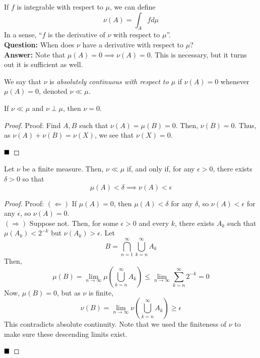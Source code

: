 
If $f$ is integrable with respect to $\mu$, we can define
\[ \nu(A) = \int_{A} f d\mu \]
In a sense, ``$f$ is the derivative of $\nu$ with respect to $\mu$''.\\

\textbf{Question:} When does $\nu$ have a derivative with respect to $\mu$?\\

\textbf{Answer:} Note that $\mu(A) = 0 \implies \nu(A) = 0$. This is necessary, but it turns out it is sufficient as well.

\begin{definition}
    We say that $\nu$ is \emph{absolutely continuous with respect to $\mu$} if $\nu(A) = 0$ whenever $\mu(A) = 0$, denoted $\nu \ll \mu$.
\end{definition}

\begin{lemma}
    If $\nu \ll \mu$ and $\nu \perp \mu$, then $\nu = 0$.
\end{lemma}
\begin{proof}{Proof:}
    Find $A, B$ such that $\nu(A) = \mu(B) = 0$. Then, $\nu(B) = 0$. Thus, as $\nu(A) + \nu(B) = \nu(X)$, we see that $\nu(X) = 0$.

    $\qed$
\end{proof}

\begin{lemma}
    Let $\nu$ be a finite measure. Then, $\nu \ll \mu$ if, and only if, for any $\epsilon > 0$, there exists $\delta > 0$ so that
    \[ \mu(A) < \delta \implies \nu(A) < \epsilon \]
\end{lemma}
\begin{proof}{Proof:}
    $(\Leftarrow)$ If $\mu(A) = 0$, then $\mu(A) < \delta$ for any $\delta$, so $\nu(A) < \epsilon$ for any $\epsilon$, so $\nu(A) = 0$.\\

    $(\Rightarrow)$ Suppose not. Then, for some $\epsilon > 0$ and every $k$, there exists $A_k$ such that $\mu(A_k) < 2^{-k}$ but $\nu(A_k) > \epsilon$. Let
    \[ B = \bigcap_{n = 1}^{\infty} \bigcup_{k = n}^{\infty} A_k \]
    Then,
    \[ \mu(B) = \lim_{n \to \infty} \mu\left(\bigcup_{k = n}^{\infty} A_k\right) \leq \lim_{n \to \infty} \sum_{k = n}^{\infty} 2^{-k} = 0 \]
    Now, $\mu(B) = 0$, but as $\nu$ is finite,
    \[ \nu(B) = \lim_{n \to \infty} \nu\left(\bigcup_{k = n}^{\infty} A_k\right) \geq \epsilon \]
    This contradicts absolute continuity. Note that we used the finiteness of $\nu$ to make sure these descending limits exist. 

    $\qed$
\end{proof}


